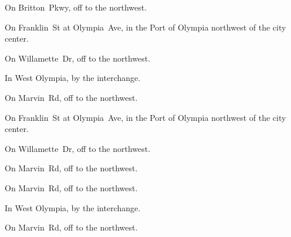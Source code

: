 
\begin{LocationList}

On Britton~Pkwy, off   to the northwest.

On Franklin~St at Olympia~Ave, in the Port of Olympia northwest of the city center.

\Location{\GarageHQ \Garage}
On Willamette~Dr, off   to the northwest.

In West Olympia, by the  interchange.

\Location{\RecruitmentAgency \Recruitment}
On Marvin~Rd, off   to the northwest.

On Franklin~St at Olympia~Ave, in the Port of Olympia northwest of the city center.

On Willamette~Dr, off   to the northwest.

On Marvin~Rd, off   to the northwest.

\Location{\TruckService \Service}
On Marvin~Rd, off   to the northwest.

In West Olympia, by the  interchange.

On Marvin~Rd, off   to the northwest.

\end{LocationList}

